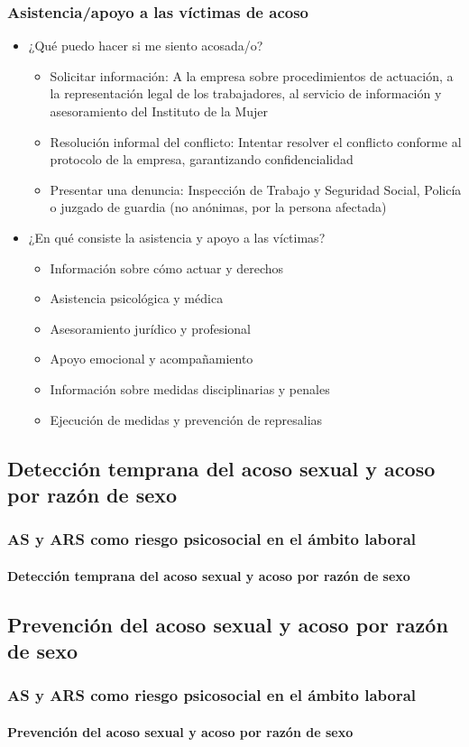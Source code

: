\documentclass{beamer}
\newcommand{\highlight}[1]{{\color{Blue} #1}}
\begin{document}
    \begin{frame}
        \frametitle{Asistencia/apoyo a las víctimas de acoso}
        \begin{itemize}
        \item ¿Qué puedo hacer si me siento acosada/o?
        \begin{itemize}
        \item \highlight{Solicitar información}: A la empresa sobre procedimientos de actuación, a la representación legal de los trabajadores, al servicio de información y asesoramiento del Instituto de la Mujer
        \item \highlight{Resolución informal del conflicto}: Intentar resolver el conflicto conforme al protocolo de la empresa, garantizando confidencialidad
        \item \highlight{Presentar una denuncia}: Inspección de Trabajo y Seguridad Social, Policía o juzgado de guardia (no anónimas, por la persona afectada)
        \end{itemize}
        \item ¿En qué consiste la asistencia y apoyo a las víctimas?
        \begin{itemize}
            \item Información sobre cómo actuar y derechos
            \item Asistencia psicológica y médica
            \item Asesoramiento jurídico y profesional
            \item Apoyo emocional y acompañamiento
            \item Información sobre medidas disciplinarias y penales
            \item Ejecución de medidas y prevención de represalias
        \end{itemize}
    \end{itemize}
    \end{frame}

    \subsection{Detección temprana del acoso sexual y acoso por razón de sexo}
    \begin{frame}
        \frametitle{AS y ARS como riesgo psicosocial en el ámbito laboral}
        \framesubtitle{Detección temprana del acoso sexual y acoso por razón de sexo}
    \end{frame}

    \subsection{Prevención del acoso sexual y acoso por razón de sexo}
    \begin{frame}
        \frametitle{AS y ARS como riesgo psicosocial en el ámbito laboral}
        \framesubtitle{Prevención del acoso sexual y acoso por razón de sexo}
    \end{frame}
\end{document}
